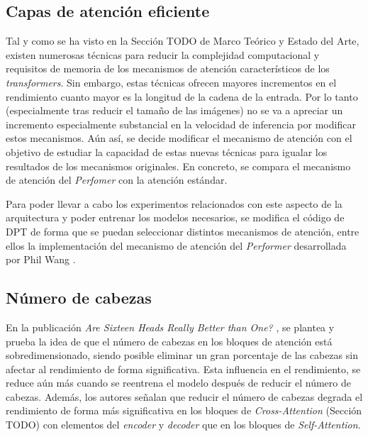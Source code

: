 

\subsection{Capas de atención eficiente}

Tal y como se ha visto en la Sección TODO de Marco Teórico y Estado del Arte, existen numerosas técnicas para reducir la complejidad computacional y requisitos de memoria de los mecanismos de atención característicos de los \textit{transformers}. Sin embargo, estas técnicas ofrecen mayores incrementos en el rendimiento cuanto mayor es la longitud de la cadena de la entrada. Por lo tanto (especialmente tras reducir el tamaño de las imágenes) no se va a apreciar un incremento especialmente substancial en la velocidad de inferencia por modificar estos mecanismos. Aún así, se decide modificar el mecanismo de atención con el objetivo de estudiar la capacidad de estas nuevas técnicas para igualar los resultados de los mecanismos originales. En concreto, se compara el mecanismo de atención del \textit{Perfomer} con la atención estándar.

Para poder llevar a cabo los experimentos relacionados con este aspecto de la arquitectura y poder entrenar los modelos necesarios, se modifica el código de DPT de forma que se puedan seleccionar distintos mecanismos de atención, entre ellos la implementación del mecanismo de atención del \textit{Performer} desarrollada por Phil Wang \cite{pwperformer}.

\subsection{Número de cabezas}
En la publicación \textit{Are Sixteen Heads Really Better than One?} \cite{are16headsbetterthan1}, se plantea y prueba la idea de que el número de cabezas en los bloques de atención está sobredimensionado, siendo posible eliminar un gran porcentaje de las cabezas sin afectar al rendimiento de forma significativa. Esta influencia en el rendimiento, se reduce aún más cuando se reentrena el modelo después de reducir el número de cabezas.  Además, los autores señalan que reducir el número de cabezas degrada el rendimiento de forma más significativa en los bloques de \textit{Cross-Attention} (Sección TODO) con elementos del \textit{encoder} y \textit{decoder} que en los bloques de \textit{Self-Attention}. 

